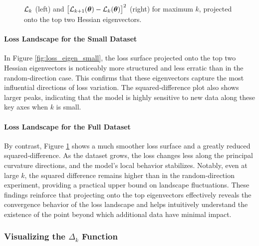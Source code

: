 \documentclass{article}
\begin{document}
\begin{figure}[!htbp]
  \hspace*{-2.2cm}
  \caption{$\mathcal{L}_k$ (left) and $\bigl[ \mathcal{L}_{k+1}(\boldsymbol{\theta}) - \mathcal{L}_k(\boldsymbol{\theta}) \bigr]^2$ (right) for maximum $k$, projected onto the top two Hessian eigenvectors.}
  \label{fig:loss_eigen_big}
\end{figure}

\paragraph{Loss Landscape for the Small Dataset}
In Figure \ref{fig:loss_eigen_small}, the loss surface projected onto the top two Hessian eigenvectors is
noticeably more structured and less erratic than in the random‐direction case. This confirms that these eigenvectors capture the
most influential directions of loss variation. The squared‐difference plot also shows larger peaks, indicating that the model is
highly sensitive to new data along these key axes when $k$ is small.

\paragraph{Loss Landscape for the Full Dataset}
By contrast, Figure \ref{fig:loss_eigen_big} shows a much smoother loss surface and a greatly reduced squared‐difference.
As the dataset grows, the loss changes less along the principal curvature directions, and the model’s local behavior stabilizes.
Notably, even at large $k$, the squared difference remains higher than in the random‐direction experiment, providing a practical upper
bound on landscape fluctuations. These findings reinforce that projecting onto the top eigenvectors effectively reveals the convergence
behavior of the loss landscape and helps intuitively understand the existence of the point beyond which additional data have minimal impact.

\subsubsection{Visualizing the \texorpdfstring{$\Delta_k$}{Delta k} Function}
\end{document}
